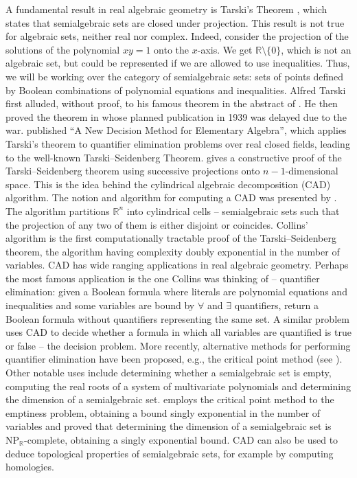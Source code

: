 \documentclass[
]{book}
\theoremstyle{definition}
\theoremstyle{definition}
\theoremstyle{definition}
\theoremstyle{definition}
\theoremstyle{remark}
\begin{document}
A fundamental result in real algebraic geometry is Tarski's Theorem \citep{vdd1988tarski}, which states that semialgebraic sets are closed under projection.
This result is not true for algebraic sets, neither real nor complex. Indeed, consider the projection of the solutions of the polynomial \(xy = 1\) onto the \(x\)-axis. We get \(\mathbb{R}\setminus \{ 0 \}\), which is not an algebraic set, but could be represented if we are allowed to use inequalities. Thus, we will be working over the category of semialgebraic sets: sets of points defined by Boolean combinations of polynomial equations and inequalities.
Alfred Tarski first alluded, without proof, to his famous theorem in the abstract of \citet{sierpinski1930}. He then proved the
theorem in \citep{tarski1998} whose planned publication in 1939 was delayed due to the war. \citet{seidenberg1954} published ``A New
Decision Method for Elementary Algebra'', which applies Tarski's theorem to quantifier elimination problems over real
closed fields, leading to the well-known Tarski--Seidenberg Theorem.
\citet{lojasiewicz1964} gives a constructive proof of the Tarski--Seidenberg theorem using successive projections onto \(n-1\)-dimensional space. This is the idea behind the cylindrical algebraic decomposition (CAD) algorithm.
The notion and algorithm for computing a CAD was presented by \citet{collins1975}.
The algorithm partitions \(\mathbb{R}^n\) into cylindrical cells -- semialgebraic sets such that the projection of any two of them is either disjoint or coincides.
Collins' algorithm is the first computationally tractable proof of the Tarski--Seidenberg theorem, the algorithm having complexity doubly exponential in the number of variables.
CAD has wide ranging applications in real algebraic geometry.
Perhaps the most famous application is the one Collins was thinking of -- quantifier elimination: given a Boolean formula where literals are polynomial equations and inequalities and some variables are bound by \(\forall\) and \(\exists\) quantifiers, return a Boolean formula without quantifiers representing the same set.
A similar problem uses CAD to decide whether a formula in which all variables are quantified is true or false -- the decision problem.
More recently, alternative methods for performing quantifier elimination have been proposed, e.g., the critical point method (see \citet{safeldin2013}).
Other notable uses include determining whether a semialgebraic set is empty, computing the real roots of a system of multivariate polynomials and determining the dimension of a semialgebraic set. \citet{bpr98} employs the critical point method to the emptiness problem, obtaining a bound singly exponential in the number of variables and \citet{koiran1999} proved that determining the dimension of a semialgebraic set is \({\mathrm{NP}}_{\mathbb{R}}\)-complete, obtaining a singly exponential bound.
CAD can also be used to deduce topological properties of semialgebraic sets, for example by computing homologies.
\end{document}
